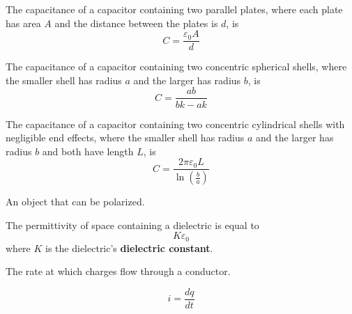 \begin{example}
  The capacitance of a capacitor containing two parallel plates, where each plate has area $A$ and the distance between the plates is $d$, is
  \[
    C = \frac{\varepsilon_0 A}{d}
  \]
\end{example}

\begin{example}
  The capacitance of a capacitor containing two concentric spherical shells, where the smaller shell has radius $a$ and the larger has radius $b$, is
  \[
    C = \frac{ab}{bk - ak}
  \]
\end{example}

\begin{example}
  The capacitance of a capacitor containing two concentric cylindrical shells with negligible end effects, where the smaller shell has radius $a$ and the larger has radius $b$ and both have length $L$, is
  \[
    C = \frac{2 \pi \varepsilon_0 L}{\ln\left(\frac{b}{a}\right)}
  \]
\end{example}

\begin{definition}[Dielectric]
  An object that can be polarized.
\end{definition}

\begin{definition}[Permittivity]
  The permittivity of space containing a dielectric is equal to
  \[
    K\varepsilon_0
  \]
  where $K$ is the dielectric's \textbf{dielectric constant}.
\end{definition}

\begin{definition}[Current ($i$)]
  The rate at which charges flow through a conductor.

  \[
    i = \frac{dq}{dt}
  \]
\end{definition}